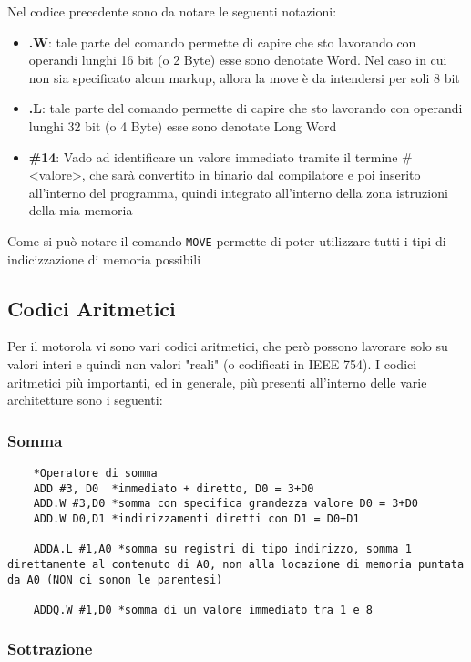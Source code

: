 Nel codice precedente sono da notare le seguenti notazioni:
\begin{itemize}
    \item \textbf{.W}: tale parte del comando permette di capire che sto lavorando con operandi lunghi 16 bit (o 2 Byte) esse sono denotate Word. Nel caso in cui non sia specificato alcun markup, allora la move è da intendersi per soli 8 bit
    \item \textbf{.L}: tale parte del comando permette di capire che sto lavorando con operandi lunghi 32 bit (o 4 Byte) esse sono denotate Long Word
    \item \textbf{\#14}: Vado ad identificare un valore immediato tramite il termine \#<valore>, che sarà convertito in binario dal compilatore e poi inserito all'interno del programma, quindi integrato all'interno della zona istruzioni della mia memoria
\end{itemize}

Come si può notare il comando \lstinline|MOVE| permette di poter utilizzare tutti i tipi di indicizzazione di memoria possibili

\newpage

\subsection{Codici Aritmetici}
Per il motorola vi sono vari codici aritmetici, che però possono lavorare solo su valori interi e quindi non valori "reali" (o codificati in IEEE 754).
I codici aritmetici più importanti, ed in generale, più presenti all'interno delle varie architetture sono i seguenti:

\subsubsection{Somma}

\begin{lstlisting}
    *Operatore di somma
    ADD #3, D0  *immediato + diretto, D0 = 3+D0
    ADD.W #3,D0 *somma con specifica grandezza valore D0 = 3+D0
    ADD.W D0,D1 *indirizzamenti diretti con D1 = D0+D1

    ADDA.L #1,A0 *somma su registri di tipo indirizzo, somma 1 direttamente al contenuto di A0, non alla locazione di memoria puntata da A0 (NON ci sonon le parentesi)

    ADDQ.W #1,D0 *somma di un valore immediato tra 1 e 8
\end{lstlisting}

\subsubsection{Sottrazione}

